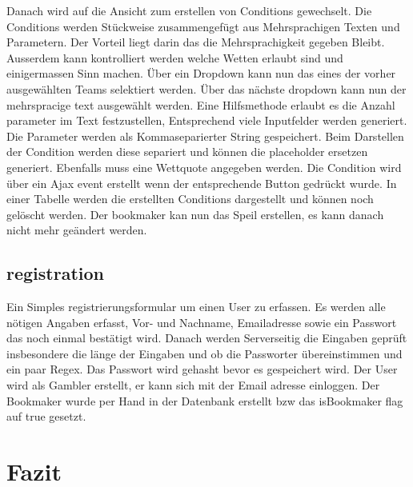 \documentclass[a4paper, abstracton]{scrartcl}
\begin{document}
  Danach wird auf die Ansicht zum erstellen von Conditions gewechselt.
  Die Conditions werden Stückweise zusammengefügt aus Mehrsprachigen Texten und
  Parametern. Der Vorteil liegt darin das die Mehrsprachigkeit gegeben Bleibt.
  Ausserdem kann kontrolliert werden welche Wetten erlaubt sind und einigermassen
  Sinn machen.
  Über ein Dropdown kann nun das eines der vorher ausgewählten Teams selektiert
  werden. Über das nächste dropdown kann nun der mehrspracige text ausgewählt werden.
  Eine Hilfsmethode erlaubt es die Anzahl parameter im Text festzustellen,
  Entsprechend viele Inputfelder werden generiert. Die Parameter werden als
  Kommaseparierter String gespeichert. Beim Darstellen der Condition werden diese
  separiert und können die placeholder ersetzen generiert.
  Ebenfalls muss eine Wettquote angegeben werden.
  Die Condition wird über ein Ajax event erstellt wenn der entsprechende Button
  gedrückt wurde. In einer Tabelle werden die erstellten Conditions dargestellt
  und können noch gelöscht werden.
  Der bookmaker kan nun das Speil erstellen, es kann danach nicht mehr geändert werden.
  
\subsection{registration}
  Ein Simples registrierungsformular um einen User zu erfassen. Es werden alle nötigen
  Angaben erfasst, Vor- und Nachname, Emailadresse sowie ein Passwort das noch
  einmal bestätigt wird.
  Danach werden Serverseitig die Eingaben geprüft insbesondere die länge der Eingaben
  und ob die Passworter übereinstimmen und ein paar Regex.
  Das Passwort wird gehasht bevor es gespeichert wird.
  Der User wird als Gambler erstellt, er kann sich mit der Email adresse einloggen.
  Der Bookmaker wurde per Hand in der Datenbank erstellt bzw das isBookmaker
  flag auf true gesetzt.

\section{Fazit}


\pagebreak
\listoffigures		%

\pagebreak	%


\pagebreak


\pagebreak	
\end{document}

